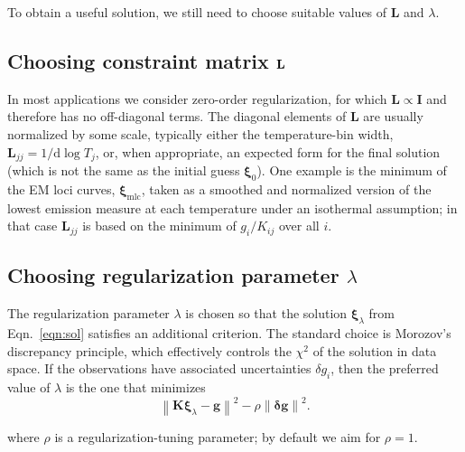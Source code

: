 \documentclass[12pt,a4paper]{article}
\begin{document}
  To obtain a useful solution, we still need to choose suitable values of $\mathbf{L}$ and $\lambda$.

\subsection*{Choosing constraint matrix ${\bf L}$}

In most applications we consider zero-order regularization, for which $\mathbf{L} \propto \mathbf{I}$ and therefore has no off-diagonal terms. The diagonal elements of $\mathbf{L}$ are usually normalized by some scale, typically either the temperature-bin width, $\mathbf{L}_{jj}=1/\mathrm{d}\log T_j$, or, when appropriate, an expected form for the final solution (which is not the same as the initial guess $\boldsymbol{\xi}_0$). One example is the minimum of the EM loci curves, $\boldsymbol{\xi}_{\mathrm{mlc}}$, taken as a smoothed and normalized version of the lowest emission measure at each temperature under an isothermal assumption; in that case $\mathbf{L}_{jj}$ is based on the minimum of $g_i/K_{ij}$ over all $i$.


\vspace{-10pt}
\subsection*{Choosing regularization parameter $\lambda$}

The regularization parameter $\lambda$ is chosen so that the solution $\boldsymbol{\xi}_\lambda$ from Eqn.~\ref{eqn:sol} satisfies an additional criterion. The standard choice is Morozov's discrepancy principle, which effectively controls the $\chi^2$ of the solution in data space. If the observations have associated uncertainties $\delta g_i$, then the preferred value of $\lambda$ is the one that minimizes
\begin{equation}\label{eqn:desc}
  \left\|\mathbf{K}\boldsymbol{\xi}_\lambda-\mathbf{g}\right\|^2 - \rho\left\|\boldsymbol{\delta g}\right\|^2.
\end{equation}

where $\rho$ is a regularization-tuning parameter; by default we aim for $\rho=1$.



%
%
%
%
\end{document}

